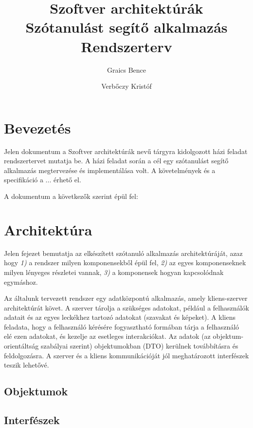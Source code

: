 \documentclass[a4paper]{article}
\begin{document}
\title{Szoftver architektúrák \\ Szótanulást segítő alkalmazás \\ \large{Rendszerterv}}
    \author{Graics Bence \and Verbőczy Kristóf}

    \maketitle
    
    \tableofcontents
    \newpage
    
    \section{Bevezetés}
    \label{sec:bevezetes}
    Jelen dokumentum a Szoftver architektúrák nevű tárgyra kidolgozott házi feladat rendszertervet mutatja be. A házi feladat során a cél egy szótanulást segítő alkalmazás megtervezése és implementálása volt. A követelmények és a specifikáció a ... érhető el.
    
    A dokumentum a következők szerint épül fel:
    
    \section{Architektúra}
    \label{sec:architektúra}
    Jelen fejezet bemutatja az elkészített szótanuló alkalmazás architektúráját, azaz hogy \textit{1)} a rendszer milyen komponensekből épül fel, \textit{2)} az egyes komponenseknek milyen lényeges részletei vannak, \textit{3)} a komponensek hogyan kapcsolódnak egymáshoz.
    
    Az általunk tervezett rendszer egy adatközpontú alkalmazás, amely kliens-szerver architektúrát követ. A szerver tárolja a szükséges adatokat, például a felhasználók adatait és az egyes leckékhez tartozó adatokat (szavakat és képeket). A kliens feladata, hogy a felhasználó kérésére fogyasztható formában tárja a felhasználó elé ezen adatokat, és kezelje az esetleges interakciókat. Az adatok (az objektum-orientáltság szabályai szerint) objektumokban (DTO) kerülnek továbbításra és feldolgozásra. A szerver és a kliens kommunikációját jól meghatározott interfészek teszik lehetővé.
    
    \subsection{Objektumok}
    
    \subsection{Interfészek}
    
\end{document}
